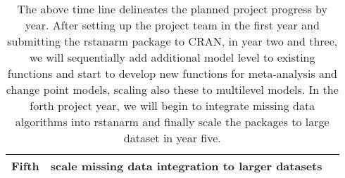 \documentclass[11pt,notitlepage]{article}
\begin{document}
\begin{table}[h]
\begin{tabular}{@{}|l|l|l|l|@{}}
\textbf{Fifth}  & \multicolumn{2}{l|}{scale missing data integration to larger datasets}                                                                                                                                                                                            &                                                                                                  \\ \bottomrule
\end{tabular}

\caption{\footnotesize The above time line delineates the planned project progress by year. After setting up the project team in the first year and submitting the rstanarm package to CRAN, in year two and three, we will sequentially add additional model level to existing functions and start to develop new functions for meta-analysis and change point models, scaling also these to multilevel models. In the forth project year, we will begin to integrate missing data algorithms into rstanarm and finally scale the packages to large dataset in year five.  }

\label{Timeline}
\end{table}



\newpage


\end{document}
